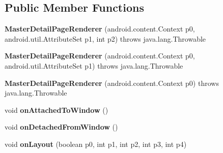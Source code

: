 \subsection*{Public Member Functions}
\begin{DoxyCompactItemize}
\item 
\hypertarget{classmd5eb25e0c6f853c9e5104b7654c9dc6cdf_1_1MasterDetailPageRenderer_ae7a113d14011bbdbf0fb585a9c93f981}{}{\bfseries Master\+Detail\+Page\+Renderer} (android.\+content.\+Context p0, android.\+util.\+Attribute\+Set p1, int p2)  throws java.\+lang.\+Throwable 	\label{classmd5eb25e0c6f853c9e5104b7654c9dc6cdf_1_1MasterDetailPageRenderer_ae7a113d14011bbdbf0fb585a9c93f981}

\item 
\hypertarget{classmd5eb25e0c6f853c9e5104b7654c9dc6cdf_1_1MasterDetailPageRenderer_aa66314f5e5172c0d77ad472ee7327bbd}{}{\bfseries Master\+Detail\+Page\+Renderer} (android.\+content.\+Context p0, android.\+util.\+Attribute\+Set p1)  throws java.\+lang.\+Throwable 	\label{classmd5eb25e0c6f853c9e5104b7654c9dc6cdf_1_1MasterDetailPageRenderer_aa66314f5e5172c0d77ad472ee7327bbd}

\item 
\hypertarget{classmd5eb25e0c6f853c9e5104b7654c9dc6cdf_1_1MasterDetailPageRenderer_a5be043ac3c341492ee6ca2a85d90754c}{}{\bfseries Master\+Detail\+Page\+Renderer} (android.\+content.\+Context p0)  throws java.\+lang.\+Throwable 	\label{classmd5eb25e0c6f853c9e5104b7654c9dc6cdf_1_1MasterDetailPageRenderer_a5be043ac3c341492ee6ca2a85d90754c}

\item 
\hypertarget{classmd5eb25e0c6f853c9e5104b7654c9dc6cdf_1_1MasterDetailPageRenderer_aaf33c44a8ac431fb0ae12776d19034e7}{}void {\bfseries on\+Attached\+To\+Window} ()\label{classmd5eb25e0c6f853c9e5104b7654c9dc6cdf_1_1MasterDetailPageRenderer_aaf33c44a8ac431fb0ae12776d19034e7}

\item 
\hypertarget{classmd5eb25e0c6f853c9e5104b7654c9dc6cdf_1_1MasterDetailPageRenderer_a5754d13f35f4391fd3c02351f65410a5}{}void {\bfseries on\+Detached\+From\+Window} ()\label{classmd5eb25e0c6f853c9e5104b7654c9dc6cdf_1_1MasterDetailPageRenderer_a5754d13f35f4391fd3c02351f65410a5}

\item 
\hypertarget{classmd5eb25e0c6f853c9e5104b7654c9dc6cdf_1_1MasterDetailPageRenderer_ad94d647a999c332c34146b84cbbb5246}{}void {\bfseries on\+Layout} (boolean p0, int p1, int p2, int p3, int p4)\label{classmd5eb25e0c6f853c9e5104b7654c9dc6cdf_1_1MasterDetailPageRenderer_ad94d647a999c332c34146b84cbbb5246}


\end{DoxyCompactItemize}
